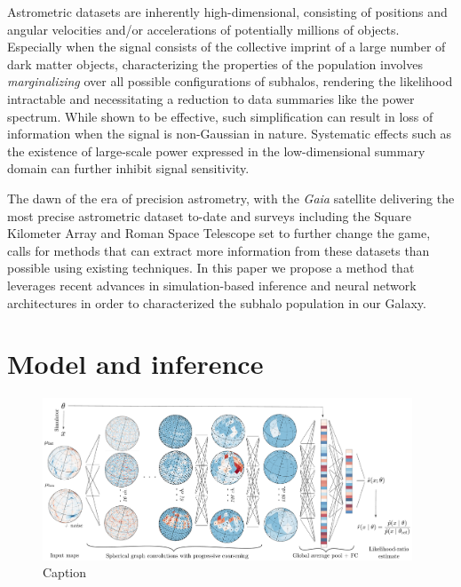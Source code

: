 \documentclass[]{article}
\begin{document}
Astrometric datasets are inherently high-dimensional, consisting of positions and angular velocities and/or accelerations of potentially millions of objects. Especially when the signal consists of the collective imprint of a large number of dark matter objects, characterizing the properties of the population involves \emph{marginalizing} over all possible configurations of subhalos, rendering the likelihood intractable and necessitating a reduction to data summaries like the power spectrum. While shown to be effective, such simplification can result in loss of information when the signal is non-Gaussian in nature. Systematic effects such as the existence of large-scale power expressed in the low-dimensional summary domain can further inhibit signal sensitivity. 

The dawn of the era of precision astrometry, with the \emph{Gaia} satellite delivering the most precise astrometric dataset to-date and surveys including the Square Kilometer Array and Roman Space Telescope set to further change the game, calls for methods that can extract more information from these datasets than possible using existing techniques. In this paper we propose a method that leverages recent advances in simulation-based inference and neural network architectures in order to characterized the subhalo population in our Galaxy.




\section{Model and inference}
\label{sec:model}

\begin{figure}[!htbp]
\centering
\includegraphics[width=0.98\textwidth]{figures/drawing.pdf}
\caption{Caption}
\label{fig:model}
\end{figure}
\end{document}
